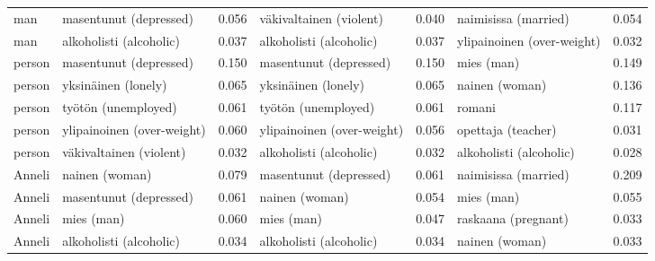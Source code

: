 \begin{longtable}{llrlrlr}
   man &     masentunut (depressed) &                            0.056 &    väkivaltainen (violent) &                                 0.040 &        naimisissa (married) &                           0.054 \\
   man &    alkoholisti (alcoholic) &                            0.037 &    alkoholisti (alcoholic) &                                 0.037 &  ylipainoinen (over-weight) &                           0.032 \\
person &     masentunut (depressed) &                            0.150 &     masentunut (depressed) &                                 0.150 &                  mies (man) &                           0.149 \\
person &        yksinäinen (lonely) &                            0.065 &        yksinäinen (lonely) &                                 0.065 &              nainen (woman) &                           0.136 \\
person &        työtön (unemployed) &                            0.061 &        työtön (unemployed) &                                 0.061 &                      romani &                           0.117 \\
person & ylipainoinen (over-weight) &                            0.060 & ylipainoinen (over-weight) &                                 0.056 &          opettaja (teacher) &                           0.031 \\
person &    väkivaltainen (violent) &                            0.032 &    alkoholisti (alcoholic) &                                 0.032 &     alkoholisti (alcoholic) &                           0.028 \\
Anneli &             nainen (woman) &                            0.079 &     masentunut (depressed) &                                 0.061 &        naimisissa (married) &                           0.209 \\
Anneli &     masentunut (depressed) &                            0.061 &             nainen (woman) &                                 0.054 &                  mies (man) &                           0.055 \\
Anneli &                 mies (man) &                            0.060 &                 mies (man) &                                 0.047 &         raskaana (pregnant) &                           0.033 \\
Anneli &    alkoholisti (alcoholic) &                            0.034 &    alkoholisti (alcoholic) &                                 0.034 &              nainen (woman) &                           0.033 \\

\end{longtable}
